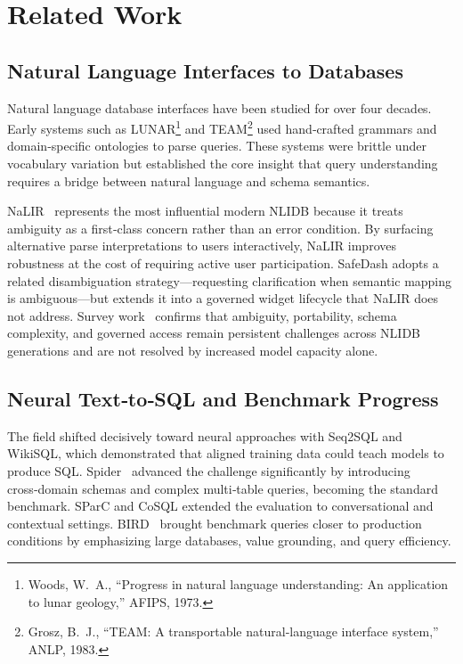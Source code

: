 \documentclass[11pt]{article}
\begin{document}
\section{Related Work}
\subsection{Natural Language Interfaces to Databases}
Natural language database interfaces have been studied for over four decades. Early systems such as LUNAR\footnote{Woods, W.~A., ``Progress in natural language understanding: An application to lunar geology,'' AFIPS, 1973.} and TEAM\footnote{Grosz, B.~J., ``TEAM: A transportable natural‑language interface system,'' ANLP, 1983.} used hand‑crafted grammars and domain‑specific ontologies to parse queries. These systems were brittle under vocabulary variation but established the core insight that query understanding requires a bridge between natural language and schema semantics.

NaLIR~\cite{li2014nalir} represents the most influential modern NLIDB because it treats ambiguity as a first‑class concern rather than an error condition. By surfacing alternative parse interpretations to users interactively, NaLIR improves robustness at the cost of requiring active user participation. SafeDash adopts a related disambiguation strategy—requesting clarification when semantic mapping is ambiguous—but extends it into a governed widget lifecycle that NaLIR does not address. Survey work~\cite{affolter2019survey,liu2026systematic} confirms that ambiguity, portability, schema complexity, and governed access remain persistent challenges across NLIDB generations and are not resolved by increased model capacity alone.

\subsection{Neural Text‑to‑SQL and Benchmark Progress}
The field shifted decisively toward neural approaches with Seq2SQL and WikiSQL\cite{zhong2018seq2sql}, which demonstrated that aligned training data could teach models to produce SQL. Spider~\cite{yu2018spider} advanced the challenge significantly by introducing cross‑domain schemas and complex multi‑table queries, becoming the standard benchmark. SParC and CoSQL\cite{yu2019sparc,yu2019cosql} extended the evaluation to conversational and contextual settings. BIRD~\cite{li2023bigbench} brought benchmark queries closer to production conditions by emphasizing large databases, value grounding, and query efficiency.
\end{document}
